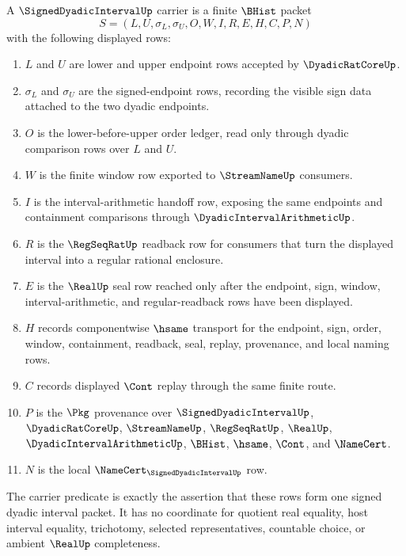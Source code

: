 \begin{definition}
\label{def:signed-dyadic-interval-carrier}
A $\SignedDyadicIntervalUp$ carrier is a finite $\BHist$ packet
$$
S=(L,U,\sigma_L,\sigma_U,O,W,I,R,E,H,C,P,N)
$$
with the following displayed rows:
\begin{enumerate}
\item $L$ and $U$ are lower and upper endpoint rows accepted by $\DyadicRatCoreUp$.
\item $\sigma_L$ and $\sigma_U$ are the signed-endpoint rows, recording the visible sign data attached to the two dyadic endpoints.
\item $O$ is the lower-before-upper order ledger, read only through dyadic comparison rows over $L$ and $U$.
\item $W$ is the finite window row exported to $\StreamNameUp$ consumers.
\item $I$ is the interval-arithmetic handoff row, exposing the same endpoints and containment comparisons through $\DyadicIntervalArithmeticUp$.
\item $R$ is the $\RegSeqRatUp$ readback row for consumers that turn the displayed interval into a regular rational enclosure.
\item $E$ is the $\RealUp$ seal row reached only after the endpoint, sign, window, interval-arithmetic, and regular-readback rows have been displayed.
\item $H$ records componentwise $\hsame$ transport for the endpoint, sign, order, window, containment, readback, seal, replay, provenance, and local naming rows.
\item $C$ records displayed $\Cont$ replay through the same finite route.
\item $P$ is the $\Pkg$ provenance over $\SignedDyadicIntervalUp$, $\DyadicRatCoreUp$, $\StreamNameUp$, $\RegSeqRatUp$, $\RealUp$, $\DyadicIntervalArithmeticUp$, $\BHist$, $\hsame$, $\Cont$, and $\NameCert$.
\item $N$ is the local $\NameCert_{\SignedDyadicIntervalUp}$ row.
\end{enumerate}
The carrier predicate is exactly the assertion that these rows form one signed dyadic interval packet. It has no coordinate for quotient real equality, host interval equality, trichotomy, selected representatives, countable choice, or ambient $\RealUp$ completeness.
\end{definition}

